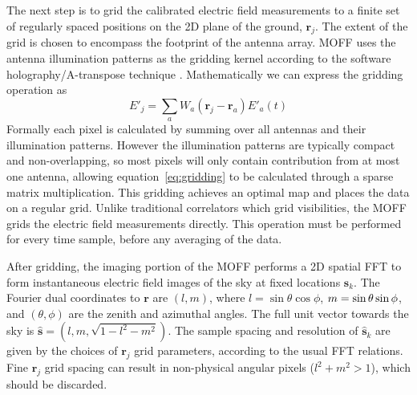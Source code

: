 \documentclass[a4paper,fleqn,usenatbib]{mnras}
\newcommand{\s}{\ensuremath{\hat{\mathbf{s}}}} %
\begin{document}
The next step is to grid the calibrated electric field measurements to a finite set of regularly spaced 
positions on the 2D plane of the ground, $\mathbf{r}_j$.
The extent of the grid is chosen to encompass the footprint of the antenna array.
MOFF uses the antenna illumination patterns as the gridding 
kernel according to the software holography/A-transpose technique \citep{mor09,bha08}. 
Mathematically we can express the gridding operation as
\begin{equation}\label{eq:gridding}
E'_j=\sum_a W_a(\mathbf{r}_j-\mathbf{r}_a) E'_a(t)
\end{equation}
Formally each pixel is calculated by summing over all antennas and their illumination patterns.
However the illumination patterns are typically compact and non-overlapping, so most pixels
will only contain contribution from at most one antenna, allowing equation~\ref{eq:gridding}
to be calculated through a sparse matrix multiplication.
This gridding 
achieves an optimal map \citep{teg97b} and places the data on a regular grid. Unlike 
traditional correlators which grid visibilities, the MOFF grids the electric field measurements directly. This 
operation must be performed for every time sample, before any averaging of the data.

After gridding, the imaging portion of the MOFF performs a 2D spatial FFT to form 
instantaneous electric field images of the sky at fixed locations $\s_k$.
The Fourier dual coordinates to $\mathbf{r}$ are $(l,m)$, where $l=\sin\theta\cos\phi$,
$m=\nobreak\sin\theta\sin\phi$, and $(\theta,\phi)$ are the zenith 
and azimuthal angles. The full unit vector towards the sky is 
$\s=(l,m,\sqrt{1-l^2-m^2})$.
The sample spacing and resolution of $\s_k$ are given 
by the choices of $\mathbf{r}_j$ grid parameters, according to the usual FFT relations. 
Fine $\mathbf{r}_j$ grid spacing can result in non-physical angular pixels ($l^2+m^2>1$),
which should be discarded.
\end{document}
